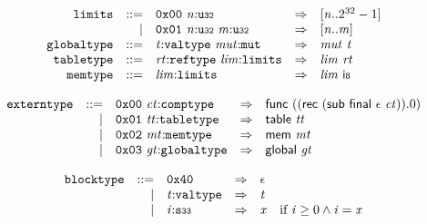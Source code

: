 \vspace{1ex}

$$
\begin{array}{@{}l@{}rrlll@{}l@{}}
& {\mathtt{limits}} &::=& \mathtt{0x00}~{\mathit{n}}{:}{\mathtt{u{\scriptstyle32}}} &\Rightarrow& {}[{\mathit{n}} .. {2^{32}} - 1] \\ &&|&
\mathtt{0x01}~{\mathit{n}}{:}{\mathtt{u{\scriptstyle32}}}~{\mathit{m}}{:}{\mathtt{u{\scriptstyle32}}} &\Rightarrow& {}[{\mathit{n}} .. {\mathit{m}}] \\
& {\mathtt{globaltype}} &::=& {\mathit{t}}{:}{\mathtt{valtype}}~{\mathit{mut}}{:}{\mathtt{mut}} &\Rightarrow& {\mathit{mut}}~{\mathit{t}} \\
& {\mathtt{tabletype}} &::=& {\mathit{rt}}{:}{\mathtt{reftype}}~{\mathit{lim}}{:}{\mathtt{limits}} &\Rightarrow& {\mathit{lim}}~{\mathit{rt}} \\
& {\mathtt{memtype}} &::=& {\mathit{lim}}{:}{\mathtt{limits}} &\Rightarrow& {\mathit{lim}}~\mathsf{i{\scriptstyle8}} \\
\end{array}
$$

\vspace{1ex}

$$
\begin{array}{@{}l@{}rrlll@{}l@{}}
& {\mathtt{externtype}} &::=& \mathtt{0x00}~{\mathit{ct}}{:}{\mathtt{comptype}} &\Rightarrow& \mathsf{func}~((\mathsf{rec}~(\mathsf{sub}~\mathsf{final}~\epsilon~{\mathit{ct}})) . 0) \\ &&|&
\mathtt{0x01}~{\mathit{tt}}{:}{\mathtt{tabletype}} &\Rightarrow& \mathsf{table}~{\mathit{tt}} \\ &&|&
\mathtt{0x02}~{\mathit{mt}}{:}{\mathtt{memtype}} &\Rightarrow& \mathsf{mem}~{\mathit{mt}} \\ &&|&
\mathtt{0x03}~{\mathit{gt}}{:}{\mathtt{globaltype}} &\Rightarrow& \mathsf{global}~{\mathit{gt}} \\
\end{array}
$$

\vspace{1ex}

\vspace{1ex}

$$
\begin{array}{@{}l@{}rrlll@{}l@{}}
& {\mathtt{blocktype}} &::=& \mathtt{0x40} &\Rightarrow& \epsilon \\ &&|&
{\mathit{t}}{:}{\mathtt{valtype}} &\Rightarrow& {\mathit{t}} \\ &&|&
{\mathit{i}}{:}{\mathtt{s{\scriptstyle33}}} &\Rightarrow& {\mathit{x}} &\quad
  \mbox{if}~{\mathit{i}} \geq 0 \land {\mathit{i}} = {\mathit{x}} \\
\end{array}
$$

